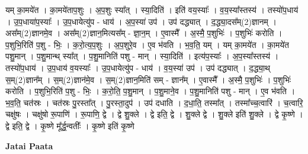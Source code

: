 \documentclass[17pt]{extarticle}
\begin{document}
यम् का॒मये॑त । का॒मये॑ताप॒शुः । अ॒प॒शुः स्या᳚त् । स्या॒दिति॑ । इति॑ वय॒स्याः᳚ । व॒य॒स्या᳚स्तस्य॑ । तस्यो॑प॒धाय॑ । उ॒प॒धाया॑प॒स्याः᳚ । उ॒प॒धायेत्यु॑प - धाय॑ । अ॒प॒स्या॑ उप॑ । उप॑ दद्ध्यात् । द॒द्ध्या॒दस᳚म्(2)ज्ञानम् । अस᳚म्(2)ज्ञानमे॒व । अस᳚म्(2)ज्ञान॒मित्यस᳚म् - ज्ञा॒न॒म् । ए॒वास्मै᳚ । अ॒स्मै॒ प॒शुभिः॑ । प॒शुभिः॑ करोति । प॒शुभि॒रिति॑ प॒शु - भिः॒ । क॒रो॒त्य॒प॒शुः । अ॒प॒शुरे॒व । ए॒व भ॑वति । भ॒व॒ति॒ यम् । यम् का॒मये॑त । का॒मये॑त पशु॒मान् । प॒शु॒मान्थ् स्या᳚त् । प॒शु॒मानिति॑ पशु - मान् । स्या॒दिति॑ । इत्य॑प॒स्याः᳚ । अ॒प॒स्या᳚स्तस्य॑ । तस्यो॑प॒धाय॑ । उ॒प॒धाय॑ व॒यस्याः᳚ । उ॒प॒धायेत्यु॑प - धाय॑ । व॒य॒स्या॑ उप॑ । उप॑ दद्ध्यात् । द॒द्ध्या॒थ् स॒म्(2)ज्ञान᳚म् । स॒म्(2)ज्ञान॑मे॒व । स॒म्(2)ज्ञान॒मिति॑ सम् - ज्ञान᳚म् । ए॒वास्मै᳚ । अ॒स्मै॒ प॒शुभिः॑ । प॒शुभिः॑ करोति । प॒शुभि॒रिति॑ प॒शु - भिः॒ । क॒रो॒ति॒ प॒शु॒मान् । प॒शु॒माने॒व । प॒शु॒मानिति॑ पशु - मान् । ए॒व भ॑वति । भ॒व॒ति॒ चत॑स्रः । चत॑स्रः पु॒रस्ता᳚त् । पु॒रस्ता॒दुप॑ । उप॑ दधाति । द॒धा॒ति॒ तस्मा᳚त् । तस्मा᳚च्च॒त्वारि॑ । च॒त्वारि॒ चक्षु॑षः । चक्षु॑षो रू॒पाणि॑ । रू॒पाणि॒ द्वे । द्वे शु॒क्ले । द्वे इति॒ द्वे । शु॒क्ले द्वे । शु॒क्ले इति॑ शु॒क्ले । द्वे कृ॒ष्णे । द्वे इति॒ द्वे । कृ॒ष्णे मू᳚र्द्ध॒न्वतीः᳚ । कृ॒ष्णे इति॑ कृ॒ष्णे \newline

\textbf{Jatai Paata} \newline
\end{document}
